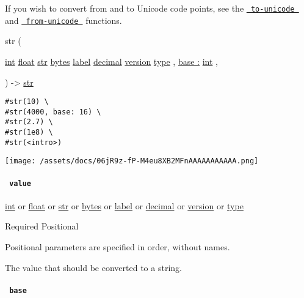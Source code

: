 If you wish to convert from and to Unicode code points, see the
\href{/docs/reference/foundations/str/\#definitions-to-unicode}{\texttt{\ to-unicode\ }}
and
\href{/docs/reference/foundations/str/\#definitions-from-unicode}{\texttt{\ from-unicode\ }}
functions.

{ str } (

{ \href{/docs/reference/foundations/int/}{int}
\href{/docs/reference/foundations/float/}{float}
\href{/docs/reference/foundations/str/}{str}
\href{/docs/reference/foundations/bytes/}{bytes}
\href{/docs/reference/foundations/label/}{label}
\href{/docs/reference/foundations/decimal/}{decimal}
\href{/docs/reference/foundations/version/}{version}
\href{/docs/reference/foundations/type/}{type} , } {
\hyperref[constructor-parameters-base]{base :}
\href{/docs/reference/foundations/int/}{int} , }

) -\textgreater{} \href{/docs/reference/foundations/str/}{str}

\begin{verbatim}
#str(10) \
#str(4000, base: 16) \
#str(2.7) \
#str(1e8) \
#str(<intro>)
\end{verbatim}

\texttt{[image: /assets/docs/06jR9z-fP-M4eu8XB2MFnAAAAAAAAAAA.png]}

\paragraph{\texorpdfstring{\texttt{\ value\ }}{ value }}\label{constructor-value}

\href{/docs/reference/foundations/int/}{int} {or}
\href{/docs/reference/foundations/float/}{float} {or}
\href{/docs/reference/foundations/str/}{str} {or}
\href{/docs/reference/foundations/bytes/}{bytes} {or}
\href{/docs/reference/foundations/label/}{label} {or}
\href{/docs/reference/foundations/decimal/}{decimal} {or}
\href{/docs/reference/foundations/version/}{version} {or}
\href{/docs/reference/foundations/type/}{type}

{Required} {{ Positional }}

\phantomsection\label{constructor-value-positional-tooltip}
Positional parameters are specified in order, without names.

The value that should be converted to a string.

\paragraph{\texorpdfstring{\texttt{\ base\ }}{ base }}\label{constructor-base}

